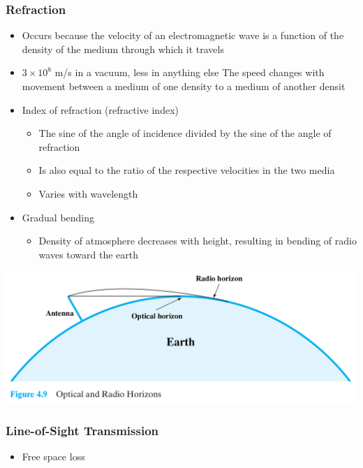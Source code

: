 \documentclass[pdflatex,compress]{beamer}
\begin{document}
\begin{frame}
	\frametitle{Refraction}
	\begin{itemize}
		\item Occurs because the velocity of an electromagnetic wave is a function of the density of the medium through which it travels
		\item $ 3 \times 10^8 $ m/s in a vacuum, less in anything else The speed changes with movement between a medium of one density to a medium of another densit
		\item Index of refraction (refractive index)
		\begin{itemize}
			\item The sine of the angle of incidence divided by the sine of the angle of refraction
			\item Is also equal to the ratio of the respective velocities in the two media
			\item Varies with wavelength
		\end{itemize}
		\item Gradual bending
		\begin{itemize}
			\item Density of atmosphere decreases with height, resulting in bending of radio waves toward the earth
		\end{itemize}
	\end{itemize}
\end{frame}

\begin{frame}
	\begin{center}
		\includegraphics[width=\linewidth]{img/img26}
	\end{center}
\end{frame}

\begin{frame}
	\frametitle{Line-of-Sight Transmission}
	\begin{itemize}
		\item Free space loss
	\end{itemize}
\end{frame}
\end{document}
